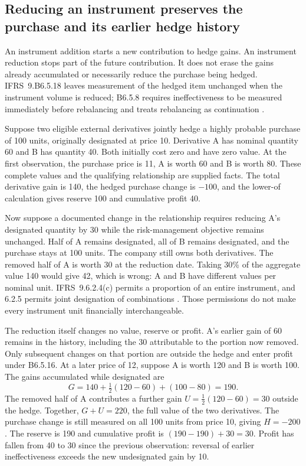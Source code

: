 \subsection{Reducing an instrument preserves the purchase and its earlier hedge history}
\label{instrument-only-reduction}

An instrument addition starts a new contribution to hedge gains. An
instrument reduction stops part of the future contribution. It does not erase
the gains already accumulated or necessarily reduce the purchase being hedged.
IFRS~9.B6.5.18 leaves measurement of the hedged item unchanged when the
instrument volume is reduced; B6.5.8 requires ineffectiveness to be measured
immediately before rebalancing and treats rebalancing as continuation
\citep[IFRS~9.B6.5.8, B6.5.16--18]{eu20231803}.

Suppose two eligible external derivatives jointly hedge a highly probable
purchase of 100 units, originally designated at price 10. Derivative A has
nominal quantity 60 and B has quantity 40. Both initially cost zero and have
zero value. At the first observation, the purchase price is 11, A is worth 60
and B is worth 80. These complete values and the qualifying relationship are
supplied facts. The total derivative gain is 140, the hedged purchase change
is \(-100\), and the lower-of calculation gives reserve 100 and cumulative
profit 40.

Now suppose a documented change in the relationship requires reducing A's
designated quantity by 30 while the risk-management objective remains
unchanged. Half of A remains designated, all of B remains designated, and the
purchase stays at 100 units. The company still owns both derivatives. The
removed half of A is worth 30 at the reduction date. Taking 30\% of the
aggregate value 140 would give 42, which is wrong: A and B have different
values per nominal unit. IFRS~9.6.2.4(c) permits a proportion of an entire
instrument, and 6.2.5 permits joint designation of combinations
\citep[IFRS~9.6.2.4--6.2.5]{eu20231803}. Those permissions do not make every
instrument unit financially interchangeable.

The reduction itself changes no value, reserve or profit. A's earlier gain of
60 remains in the history, including the 30 attributable to the portion now
removed. Only subsequent changes on that portion are outside the hedge and
enter profit under B6.5.16. At a later price of 12, suppose A is worth 120 and
B is worth 100. The gains accumulated while designated are
\[
 G=140+\tfrac12(120-60)+(100-80)=190.
\]
The removed half of A contributes a further gain
\(U=\tfrac12(120-60)=30\) outside the hedge. Together,
\(G+U=220\), the full value of the two derivatives. The purchase change is
still measured on all 100 units from price 10, giving \(H=-200\).
The reserve is 190 and cumulative profit is
\((190-190)+30=30\). Profit has fallen from 40 to 30 since the previous
observation: reversal of earlier ineffectiveness exceeds the new undesignated
gain by 10.

